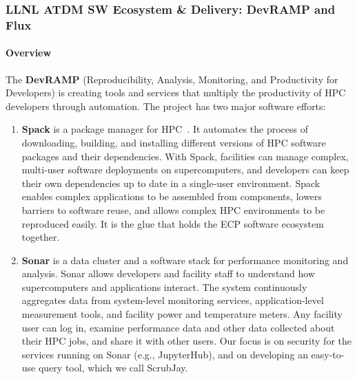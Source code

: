 \subsubsection{ LLNL ATDM SW Ecosystem \& Delivery: DevRAMP and Flux}

\paragraph{Overview}
The {\bf DevRAMP} (Reproducibility, Analysis, Monitoring, and Productivity
for Developers) is creating tools and services that multiply the
productivity of HPC developers through automation. The project has two
major software efforts:

\begin{enumerate}
    \item {\bf Spack} is a package manager for
    HPC~\cite{melara+:cug17,gamblin+:sc17-spack-tutorial,gamblin+:sc16-spack-tutorial,gamblin+:sc15,gamblin+:llnl-spack-tutorial-17,gamblin+:ecp18-spack-tutorial,gamblin:pp18-spack,gamblin:hpckp17,gamblin:fosdem18-compilers,gamblin:fosdem18-binary,gamblin:ecp18-spack-sotu,gamblin:eb-user-meeting18,becker+:hust16}. It
    automates the process of downloading, building, and installing
    different versions of HPC software packages and their dependencies.
    With Spack, facilities can manage complex, multi-user software
    deployments on supercomputers, and developers can keep their own
    dependencies up to date in a single-user environment. Spack enables
    complex applications to be assembled from components, lowers barriers
    to software reuse, and allows complex HPC environments to be
    reproduced easily. It is the glue that holds the ECP software
    ecosystem together.

    \item {\bf Sonar} is a data cluster and a software stack for
    performance monitoring and analysis. Sonar allows developers and
    facility staff to understand how supercomputers and applications
    interact. The system continuously aggregates data from system-level
    monitoring services, application-level measurement tools, and
    facility power and temperature meters.  Any facility user can log in,
    examine performance data and other data collected about their HPC
    jobs, and share it with other users. Our focus is on security for the
    services running on Sonar (e.g., JupyterHub), and on developing an
    easy-to-use query tool, which we call ScrubJay.
\end{enumerate}


